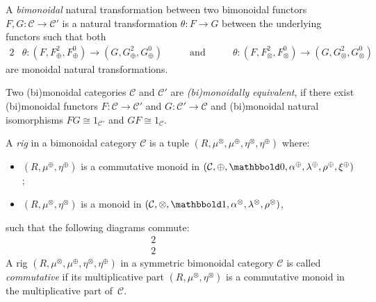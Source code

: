 \documentclass[10pt]{simplearticle}
\newcommand{\tikzinput}[1]{}
\newcommand{\tensorunit}{\mathbbold1}
\newcommand{\bbzero}{\mathbbold0}
\begin{document}
\begin{defn}\label{def:bimon-nt}
 A \emph{bimonoidal} natural transformation between
two bimonoidal functors $F,G\colon\mathcal{C}\to\mathcal{C}'$ is
a natural transformation $\theta\colon F\to G$ between the underlying
functors such that both
\begin{alignat*}{2}
 & \theta\colon(F,F^{2}_{\oplus},F^{0}_{\oplus})\to(G,G^{2}_{\oplus},G^{0}_{\oplus}) & \qquad\textrm{and}\qquad & \theta\colon(F,F^{2}_{\otimes},F^{0}_{\otimes})\to(G,G^{2}_{\otimes},G^{0}_{\otimes})
\end{alignat*}
are monoidal natural transformations.
\end{defn}

\begin{defn}\label{def:bimon-equiv}
Two
(bi)monoidal categories
$\mathcal{C}$ and $\mathcal{C}'$ are \emph{(bi)monoidally equivalent},
if there exist (bi)monoidal functors $F\colon\mathcal{C}\to\mathcal{C}'$
and $G\colon\mathcal{C}'\to\mathcal{C}$ and (bi)monoidal natural
isomorphisms $FG\cong1_{\mathcal{C}'}$ and $GF\cong1_{\mathcal{C}}$.
\end{defn}

\begin{defn}
\label{def:rig} A
\emph{rig}
in a bimonoidal category $\mathcal{C}$ is a tuple $(R,\mu^{\otimes},\mu^{\oplus},\eta^{\otimes},\eta^{\oplus})$
where:
\begin{itemize}
\item $(R,\mu^{\oplus},\eta^{\oplus})$ is a commutative monoid in $(\mathcal{C},\oplus,\text{\ensuremath{\bbzero}},\alpha^{\oplus},\lambda^{\oplus},\rho^{\oplus},\xi^{\oplus})$;
\item $(R,\mu^{\otimes},\eta^{\otimes})$ is a monoid in $(\mathcal{C},\otimes,\tensorunit,\alpha^{\otimes},\lambda^{\otimes},\rho^{\otimes})$,
\end{itemize}
such that the following diagrams commute:
\begin{alignat}{2}
\tikzinput{d335} & \qquad\qquad & \tikzinput{d337}\label{eq:rig-1}
\end{alignat}
\begin{alignat}{2}
\tikzinput{d336} & \qquad\qquad & \tikzinput{d338}\label{eq:rig-2}
\end{alignat}
A
rig $(R,\mu^{\otimes},\mu^{\oplus},\eta^{\otimes},\eta^{\oplus})$
in a symmetric bimonoidal category $\mathcal{C}$ is called \emph{commutative}
if its multiplicative part $(R,\mu^{\otimes},\eta^{\otimes})$ is
a commutative monoid in the multiplicative part of~$\mathcal{C}$.

\end{defn}
\end{document}
